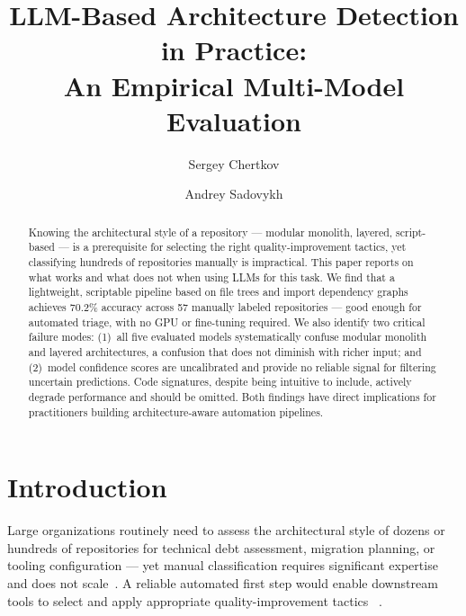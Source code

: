 \documentclass[runningheads]{llncs}
\begin{document}
\title{LLM-Based Architecture Detection in Practice:\\An Empirical Multi-Model Evaluation}


\author{Sergey Chertkov \and Andrey Sadovykh}


\maketitle

\begin{abstract}
Knowing the architectural style of a repository --- modular monolith, layered, script-based --- is a prerequisite for selecting the right quality-improvement tactics, yet classifying hundreds of repositories manually is impractical. This paper reports on what works and what does not when using LLMs for this task. We find that a lightweight, scriptable pipeline based on file trees and import dependency graphs achieves 70.2\% accuracy across 57 manually labeled repositories --- good enough for automated triage, with no GPU or fine-tuning required. We also identify two critical failure modes: (1)~all five evaluated models systematically confuse modular monolith and layered architectures, a confusion that does not diminish with richer input; and (2)~model confidence scores are uncalibrated and provide no reliable signal for filtering uncertain predictions. Code signatures, despite being intuitive to include, actively degrade performance and should be omitted. Both findings have direct implications for practitioners building architecture-aware automation pipelines.
\end{abstract}

\section{Introduction}
\label{sec:introduction}

Large organizations routinely need to assess the architectural style of dozens or hundreds of repositories for technical debt assessment, migration planning, or tooling configuration --- yet manual classification requires significant expertise and does not scale~\cite{esposito2025generative}. A reliable automated first step would enable downstream tools to select and apply appropriate quality-improvement tactics~\cite{bass2021software} \cite{marquez2022architectural}.
\end{document}
